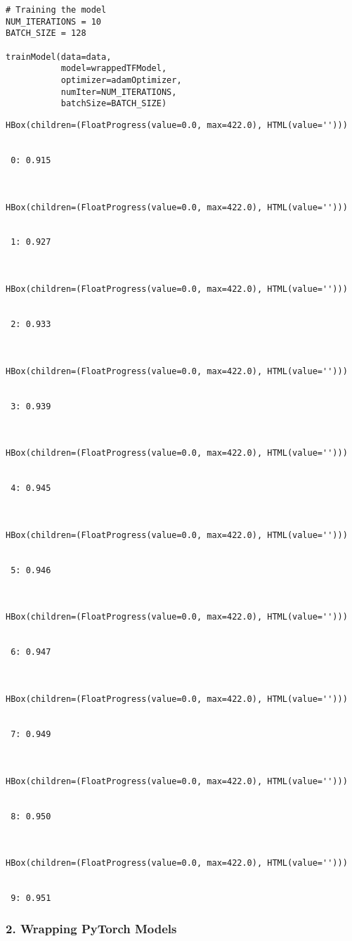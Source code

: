\documentclass[
]{article}
\begin{document}
\begin{verbatim}
# Training the model
NUM_ITERATIONS = 10
BATCH_SIZE = 128

trainModel(data=data,
           model=wrappedTFModel,
           optimizer=adamOptimizer,
           numIter=NUM_ITERATIONS,
           batchSize=BATCH_SIZE)
\end{verbatim}

\begin{verbatim}
HBox(children=(FloatProgress(value=0.0, max=422.0), HTML(value='')))


 0: 0.915



HBox(children=(FloatProgress(value=0.0, max=422.0), HTML(value='')))


 1: 0.927



HBox(children=(FloatProgress(value=0.0, max=422.0), HTML(value='')))


 2: 0.933



HBox(children=(FloatProgress(value=0.0, max=422.0), HTML(value='')))


 3: 0.939



HBox(children=(FloatProgress(value=0.0, max=422.0), HTML(value='')))


 4: 0.945



HBox(children=(FloatProgress(value=0.0, max=422.0), HTML(value='')))


 5: 0.946



HBox(children=(FloatProgress(value=0.0, max=422.0), HTML(value='')))


 6: 0.947



HBox(children=(FloatProgress(value=0.0, max=422.0), HTML(value='')))


 7: 0.949



HBox(children=(FloatProgress(value=0.0, max=422.0), HTML(value='')))


 8: 0.950



HBox(children=(FloatProgress(value=0.0, max=422.0), HTML(value='')))


 9: 0.951
\end{verbatim}

\hypertarget{wrapping-pytorch-models}{%
\subsubsection{2. Wrapping PyTorch
Models}\label{wrapping-pytorch-models}}
\end{document}
